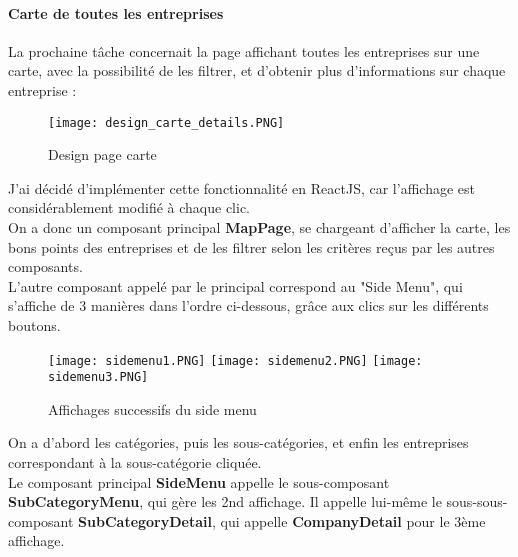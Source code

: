 \paragraph{Carte de toutes les entreprises}


La prochaine tâche concernait la page affichant toutes les entreprises sur une carte, avec la possibilité de les filtrer, et d'obtenir plus d'informations sur chaque entreprise :

\begin{figure}[H]
    \centering
    \texttt{[image: design\_carte\_details.PNG]}
    \caption{Design page carte}
\end{figure}

J'ai décidé d'implémenter cette fonctionnalité en ReactJS, car l'affichage est considérablement modifié à chaque clic.
\\On a donc un composant principal \textbf{MapPage}, se chargeant d'afficher la carte, les bons points des entreprises et de les filtrer selon les critères reçus par les autres composants.
\\L'autre composant appelé par le principal correspond au "Side Menu", qui s'affiche de 3 manières dans l'ordre ci-dessous, grâce aux clics sur les différents boutons.

\begin{figure}[H]
    \texttt{[image: sidemenu1.PNG]}
    \texttt{[image: sidemenu2.PNG]}
    \texttt{[image: sidemenu3.PNG]}
    \caption{Affichages successifs du side menu}
\end{figure}

On a d'abord les catégories, puis les sous-catégories, et enfin les entreprises correspondant à la sous-catégorie cliquée.
\\Le composant principal \textbf{SideMenu} appelle le sous-composant \textbf{SubCategoryMenu}, qui gère les 2nd affichage. 
Il appelle lui-même le sous-sous-composant \textbf{SubCategoryDetail}, qui appelle \textbf{CompanyDetail} pour le 3ème affichage.\\

